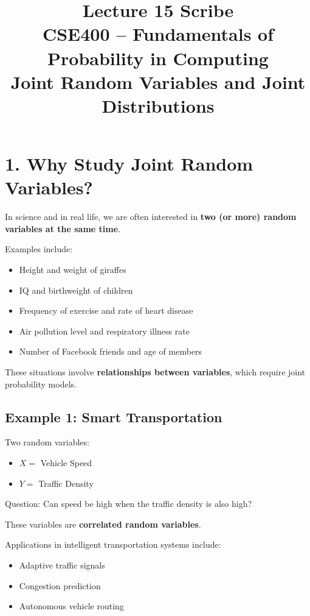 \documentclass[12pt]{article}
\title{\textbf{Lecture 15 Scribe}\\
CSE400 -- Fundamentals of Probability in Computing\\
\large Joint Random Variables and Joint Distributions}
\author{}
\date{}
\begin{document}
\maketitle

\section*{1. Why Study Joint Random Variables?}

In science and in real life, we are often interested in \textbf{two (or more) random variables at the same time}.

Examples include:

\begin{itemize}
\item Height and weight of giraffes
\item IQ and birthweight of children
\item Frequency of exercise and rate of heart disease
\item Air pollution level and respiratory illness rate
\item Number of Facebook friends and age of members
\end{itemize}

These situations involve \textbf{relationships between variables}, which require joint probability models.

\subsection*{Example 1: Smart Transportation}

Two random variables:

\begin{itemize}
\item $X =$ Vehicle Speed
\item $Y =$ Traffic Density
\end{itemize}

Question: Can speed be high when the traffic density is also high?

These variables are \textbf{correlated random variables}.

Applications in intelligent transportation systems include:

\begin{itemize}
\item Adaptive traffic signals
\item Congestion prediction
\item Autonomous vehicle routing
\end{itemize}
\end{document}
